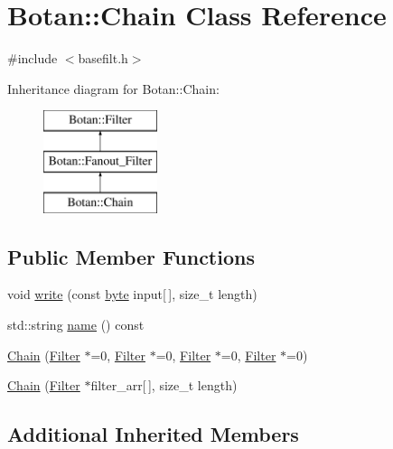 \hypertarget{classBotan_1_1Chain}{\section{Botan\-:\-:Chain Class Reference}
\label{classBotan_1_1Chain}
}


{\ttfamily \#include $<$basefilt.\-h$>$}

Inheritance diagram for Botan\-:\-:Chain\-:\begin{figure}[H]
\begin{center}
\leavevmode
\includegraphics[height=3.000000cm]{classBotan_1_1Chain}
\end{center}
\end{figure}
\subsection*{Public Member Functions}
\begin{DoxyCompactItemize}
\item 
void \hyperlink{classBotan_1_1Chain_a7e388d156e61e5e98ffd2ab6ceed91c7}{write} (const \hyperlink{namespaceBotan_a7d793989d801281df48c6b19616b8b84}{byte} input\mbox{[}$\,$\mbox{]}, size\-\_\-t length)
\item 
std\-::string \hyperlink{classBotan_1_1Chain_adff41cfb47851fe8da277ec6306c2274}{name} () const 
\item 
\hyperlink{classBotan_1_1Chain_a32cc4fc8e57ead4ff2d3c911b3b72d33}{Chain} (\hyperlink{classBotan_1_1Filter}{Filter} $\ast$=0, \hyperlink{classBotan_1_1Filter}{Filter} $\ast$=0, \hyperlink{classBotan_1_1Filter}{Filter} $\ast$=0, \hyperlink{classBotan_1_1Filter}{Filter} $\ast$=0)
\item 
\hyperlink{classBotan_1_1Chain_a056efdfd41facdf256782820237a1b58}{Chain} (\hyperlink{classBotan_1_1Filter}{Filter} $\ast$filter\-\_\-arr\mbox{[}$\,$\mbox{]}, size\-\_\-t length)
\end{DoxyCompactItemize}
\subsection*{Additional Inherited Members}


